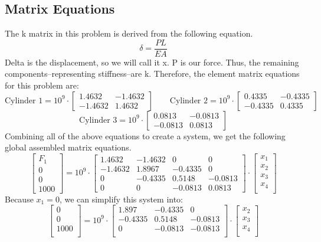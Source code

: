 \documentclass[8pt]{article}
\begin{document}
\subsection{Matrix Equations}
The k matrix in this problem is derived from the following equation.
\[
\delta = \frac{PL}{EA}
\]
Delta is the displacement, so we will call it x. P is our force. Thus, the remaining components--representing stiffness--are k. Therefore, the element matrix equations for this problem are:
\[
\mbox{Cylinder 1} = 10^9 \cdot
\begin{bmatrix}
    1.4632 & -1.4632 \\
    -1.4632 & 1.4632
\end{bmatrix}
\quad \quad
\mbox{Cylinder 2} = 10^9 \cdot
\begin{bmatrix}
    0.4335 & -0.4335 \\
    -0.4335 & 0.4335
\end{bmatrix}
\]
\[
\mbox{Cylinder 3} = 10^9 \cdot
\begin{bmatrix}
    0.0813 & -0.0813 \\
    -0.0813 & 0.0813
\end{bmatrix}
\]
Combining all of the above equations to create a system, we get the following global assembled matrix equations.
\[
    \begin{bmatrix}
        F_1 \\
        0 \\
        0 \\
        1000
    \end{bmatrix}
    =
    10^9 \cdot
    \begin{bmatrix}
        1.4632 & -1.4632 & 0 & 0 \\
        -1.4632 & 1.8967 & -0.4335 & 0 \\
         0 & -0.4335 & 0.5148 & -0.0813 \\
         0 & 0 & -0.0813 & 0.0813
    \end{bmatrix}
    \cdot
    \begin{bmatrix}
        x_1 \\
        x_2 \\
        x_3 \\
        x_4 \\
    \end{bmatrix}
\]
Because \(x_1 = 0\), we can simplify this system into:
\[
\begin{bmatrix}
    0 \\ 
    0 \\ 
    1000 \\
\end{bmatrix}
=
10^9 \cdot
\begin{bmatrix}
    1.897 & -0.4335 & 0 \\
    -0.4335 & 0.5148 & -0.0813 \\
    0 & -0.0813 & -0.0813\\
\end{bmatrix}
\cdot
\begin{bmatrix}
    x_2 \\ 
    x_3 \\ 
    x_4 \\
\end{bmatrix}
\]
\end{document}
